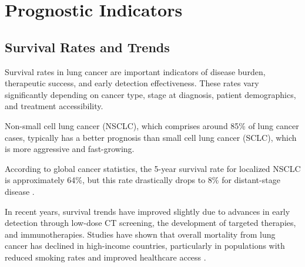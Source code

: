 
\section{Prognostic Indicators}


\subsection{Survival Rates and Trends}

Survival rates in lung cancer are important indicators of disease burden, therapeutic success, and 
early detection effectiveness. These rates vary significantly depending on cancer type, stage at 
diagnosis, patient demographics, and treatment accessibility.

Non-small cell lung cancer (NSCLC), which comprises around 85\% of lung cancer cases, typically has 
a better prognosis than small cell lung cancer (SCLC), which is more aggressive and fast-growing. 

According to global cancer statistics, the 5-year survival rate for localized NSCLC is approximately 
64\%, but this rate drastically drops to 8\% for distant-stage disease \cite{cancerstats2023}.

In recent years, survival trends have improved slightly due to advances in early detection through 
low-dose CT screening, the development of targeted therapies, and immunotherapies. Studies have 
shown that overall mortality from lung cancer has declined in high-income countries, particularly in 
populations with reduced smoking rates and improved healthcare access \cite{siegeletc2022trends}.

